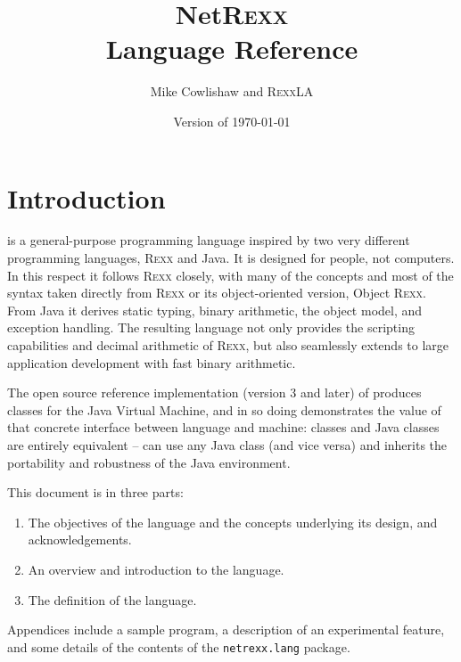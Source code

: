 

\renewcommand{\isbn}{978-94-648-5133-5}
\setcounter{tocdepth}{1}
\title{NetR\textsc{exx}\protect{}\\Language Reference}
\author{Mike Cowlishaw and R\textsc{exx}LA}
\date{\null\hfill Version  of \today}
\maketitle
{}
\pagestyle{plain}
\frontmatter
{}
\pagestyle{plain}

\tableofcontents

\newpage
{}
\frontmatter
\large

%
\mainmatter
\chapter{Introduction}
\nr{} is a general-purpose programming language inspired by two very
different programming languages, R\textsc{exx}\textsuperscript{\texttrademark} and Java\textsuperscript{\texttrademark}. It is designed for
people, not computers. In this respect it follows R\textsc{exx} closely, with
many of the concepts and most of the syntax taken directly from R\textsc{exx}
or its object-oriented version, Object R\textsc{exx}. From Java it derives
static typing, binary arithmetic, the object model, and exception
handling. The resulting language not only provides the scripting
capabilities and decimal arithmetic of R\textsc{exx}, but also seamlessly
extends to large application development with fast binary arithmetic.

The open source reference implementation (version 3 and later) of
\nr{} produces classes for the Java Virtual Machine, and in so doing
demonstrates the value of that concrete interface between language and
machine: \nr{} classes and Java classes are entirely equivalent –
\nr{} can use any Java class (and vice versa) and inherits the
portability and robustness of the Java environment.

This document is in three parts:
\begin{enumerate}
\item The objectives of the \nr{} language and the concepts underlying its design, and acknowledgements.
\item An overview and introduction to the \nr{} language.
\item The definition of the language.
\end{enumerate}
Appendices include a sample \nr{} program, a description of an experimental feature, and some
details of the contents of the \texttt{netrexx.lang} package.
